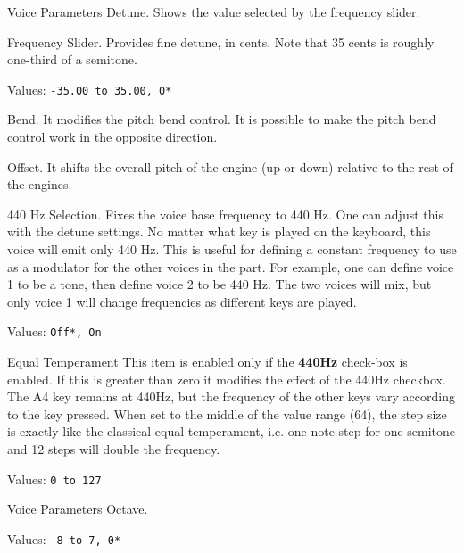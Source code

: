    \setcounter{ItemCounter}{0}      %

   Voice Parameters Detune.
   Shows the value selected by the frequency slider.

   Frequency Slider.
   Provides fine detune, in cents.
   Note that 35 cents is roughly one-third of a semitone.

   Values: \texttt{-35.00 to 35.00, 0*}

   Bend.
   It modifies the pitch bend control.  It is possible to make the pitch
   bend control work in the opposite direction.

   Offset.
   It shifts the overall pitch of the engine (up or down) relative to the rest
   of the engines.

   440 Hz Selection.
   Fixes the voice base frequency to 440 Hz.
   One can adjust this with the detune settings.
   No matter what key is played on the keyboard, this voice will emit only
   440 Hz.  This is useful for defining a constant frequency to use as a
   modulator for the other voices in the part.
   For example, one can define voice 1 to be a tone, then
   define voice 2 to be 440 Hz.  The two voices will mix, but only voice 1
   will change frequencies as different keys are played.

   Values: \texttt{Off*, On}

   Equal Temperament
   This item is enabled only if the \textbf{440Hz} check-box is enabled.
   If this is greater than zero it modifies the effect of the 440Hz checkbox. The A4
   key remains at 440Hz, but the frequency of the other keys vary according to the
   key pressed. When set to the middle of the value range (64), the step size is
   exactly like the classical equal temperament, i.e. one note step for one semitone
   and 12 steps will double the frequency.

   Values: \texttt{0 to 127}

   Voice Parameters Octave.

   Values: \texttt{-8 to 7, 0*}

%

